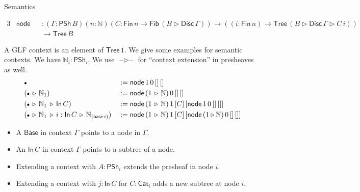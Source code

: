 \documentclass[dvipsnames,aspectratio=169]{beamer}
\newcommand{\ms}[1]{\mathsf{#1}}
\newcommand{\mbb}[1]{\mathbb{#1}}
\newcommand{\blank}{\mathord{\hspace{1pt}\text{--}\hspace{1pt}}}
\newcommand{\Fib}{\mathsf{Fib}}
\newcommand{\Fin}{\mathsf{Fin}}
\newcommand{\Tree}{\mathsf{Tree}}
\newcommand{\Disc}{\mathsf{Disc}}
\newcommand{\Base}{\mathsf{Base}}
\newcommand{\In}{\mathsf{In}}
\newcommand{\PSh}{\mathsf{PSh}}
\newcommand{\Cat}{\mathsf{Cat}}
\newcommand{\base}{\mathsf{base}}
\newcommand{\ext}{\triangleright}
\newcommand{\emptycon}{\scaleobj{.75}\bullet}
\begin{document}
\begin{frame}{Semantics}

\begin{block}{}
\vspace{-1em}
{\small
\begin{alignat*}{3}
  & \ms{node} &&: (\Gamma : \PSh\,B)(n : \mbb{N})(C : \Fin\,n \to \Fib\,(B \ext \Disc\,\Gamma)) \to ((i : \Fin\,n) \to \Tree\,(B \ext \Disc\,\Gamma \ext C\,i)) \\
  & &&\to \Tree\,B
\end{alignat*}
}
\end{block}
\vspace{0.5em}

A GLF context is an element of $\Tree\,1$. We give some examples for semantic contexts. We have $\mbb{N}_i : \PSh_i$. We use $\blank\ext\blank$ for ``context extension'' in presheaves as well.
\begin{alignat*}{3}
  & \emptycon &&:= \ms{node}\,1\,0\,[]\,[]\\
  & (\emptycon\,\ext\,\mbb{N}_1) &&:= \ms{node}\,(1\,\ext\,\mbb{N})\,0\,[]\,[]\\
  & (\emptycon\,\ext\,\mbb{N}_1\,\ext\,\In\,C) &&:= \ms{node}\,(1\,\ext\,\mbb{N})\,1\,[C]\,[\ms{node}\,1\,0\,[]\,[]]\\
  & (\emptycon\,\ext\,\mbb{N}_1\,\ext\,i : \In\,C\,\ext\,\mbb{N}_{(\base\,i)}) &&:= \ms{node}\,(1\,\ext\,\mbb{N})\,1\,[C]\,[\ms{node}\,(1 \ext \mbb{N})\,0\,[]\,[]]
\end{alignat*}
\vspace{-1em}
\pause

\begin{itemize}
\item A $\Base$ in context $\Gamma$ points to a node in $\Gamma$.
\item An $\In\,C$ in context $\Gamma$ points to a subtree of a node.
\item Extending a context with $A : \PSh_i$ extends the presheaf in node $i$.
\item Extending a context with $j : \In\,C$ for $C : \Cat_i$ adds a new subtree at node $i$.
\end{itemize}
\end{frame}
\end{document}
